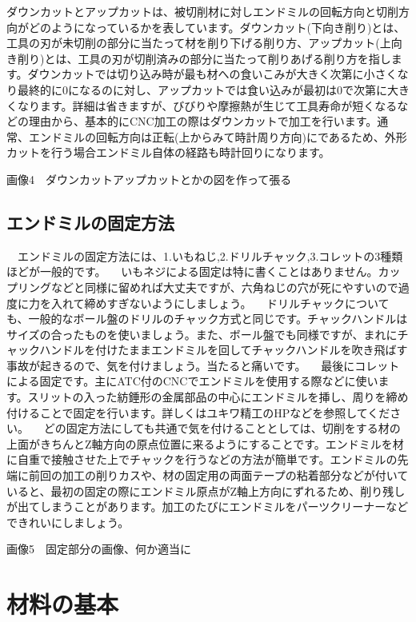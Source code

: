 \documentclass[onecolumn]{preport}
\begin{document}
ダウンカットとアップカットは、被切削材に対しエンドミルの回転方向と切削方向がどのようになっているかを表しています。ダウンカット(下向き削り)とは、工具の刃が未切削の部分に当たって材を削り下げる削り方、アップカット(上向き削り)とは、工具の刃が切削済みの部分に当たって削りあげる削り方を指します。ダウンカットでは切り込み時が最も材への食いこみが大きく次第に小さくなり最終的に0になるのに対し、アップカットでは食い込みが最初は0で次第に大きくなります。詳細は省きますが、びびりや摩擦熱が生じて工具寿命が短くなるなどの理由から、基本的にCNC加工の際はダウンカットで加工を行います。通常、エンドミルの回転方向は正転(上からみて時計周り方向)にであるため、外形カットを行う場合エンドミル自体の経路も時計回りになります。

画像4　ダウンカットアップカットとかの図を作って張る

\subsection{エンドミルの固定方法}

　エンドミルの固定方法には、1.いもねじ,2.ドリルチャック,3.コレットの3種類ほどが一般的です。
　いもネジによる固定は特に書くことはありません。カップリングなどと同様に留めれば大丈夫ですが、六角ねじの穴が死にやすいので過度に力を入れて締めすぎないようにしましょう。
　ドリルチャックについても、一般的なボール盤のドリルのチャック方式と同じです。チャックハンドルはサイズの合ったものを使いましょう。また、ボール盤でも同様ですが、まれにチャックハンドルを付けたままエンドミルを回してチャックハンドルを吹き飛ばす事故が起きるので、気を付けましょう。当たると痛いです。
　最後にコレットによる固定です。主にATC付のCNCでエンドミルを使用する際などに使います。スリットの入った紡錘形の金属部品の中心にエンドミルを挿し、周りを締め付けることで固定を行います。詳しくはユキワ精工のHPなどを参照してください。
　どの固定方法にしても共通で気を付けることとしては、切削をする材の上面がきちんとZ軸方向の原点位置に来るようにすることです。エンドミルを材に自重で接触させた上でチャックを行うなどの方法が簡単です。エンドミルの先端に前回の加工の削りカスや、材の固定用の両面テープの粘着部分などが付いていると、最初の固定の際にエンドミル原点がZ軸上方向にずれるため、削り残しが出てしまうことがあります。加工のたびにエンドミルをパーツクリーナーなどできれいにしましょう。

画像5　固定部分の画像、何か適当に

\section{材料の基本}
\end{document}
